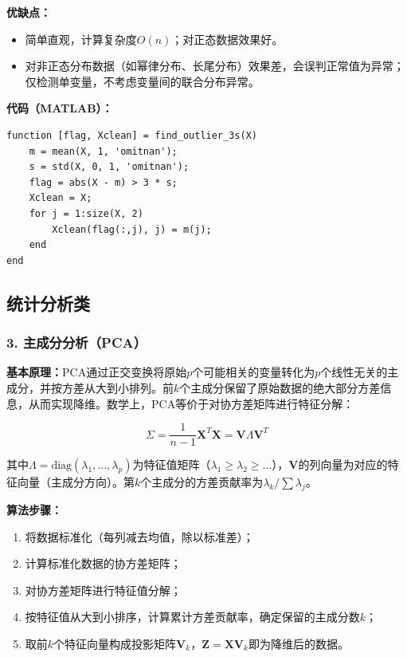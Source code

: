 \documentclass[12pt,a4paper]{ctexart}
\begin{document}
\textbf{优缺点：}
\begin{itemize}[leftmargin=*]
    \item[+] 简单直观，计算复杂度$O(n)$；对正态数据效果好。
    \item[$-$] 对非正态分布数据（如幂律分布、长尾分布）效果差，会误判正常值为异常；仅检测单变量，不考虑变量间的联合分布异常。
\end{itemize}

\textbf{代码（MATLAB）：}
\begin{lstlisting}
function [flag, Xclean] = find_outlier_3s(X)
    m = mean(X, 1, 'omitnan');
    s = std(X, 0, 1, 'omitnan');
    flag = abs(X - m) > 3 * s;
    Xclean = X;
    for j = 1:size(X, 2)
        Xclean(flag(:,j), j) = m(j);
    end
end
\end{lstlisting}

\subsection{统计分析类}

\subsubsection{3. 主成分分析（PCA）}

\textbf{基本原理：}PCA通过正交变换将原始$p$个可能相关的变量转化为$p$个线性无关的主成分，并按方差从大到小排列。前$k$个主成分保留了原始数据的绝大部分方差信息，从而实现降维。数学上，PCA等价于对协方差矩阵进行特征分解：

\begin{equation}
\Sigma = \frac{1}{n-1} \mathbf{X}^T \mathbf{X} = \mathbf{V} \Lambda \mathbf{V}^T
\end{equation}

其中$\Lambda = \text{diag}(\lambda_1, \dots, \lambda_p)$为特征值矩阵（$\lambda_1 \ge \lambda_2 \ge \dots$），$\mathbf{V}$的列向量为对应的特征向量（主成分方向）。第$k$个主成分的方差贡献率为$\lambda_k / \sum \lambda_j$。

\textbf{算法步骤：}
\begin{enumerate}[label=(\arabic*), leftmargin=*]
    \item 将数据标准化（每列减去均值，除以标准差）；
    \item 计算标准化数据的协方差矩阵；
    \item 对协方差矩阵进行特征值分解；
    \item 按特征值从大到小排序，计算累计方差贡献率，确定保留的主成分数$k$；
    \item 取前$k$个特征向量构成投影矩阵$\mathbf{V}_k$，$\mathbf{Z} = \mathbf{X}\mathbf{V}_k$即为降维后的数据。
\end{enumerate}
\end{document}
